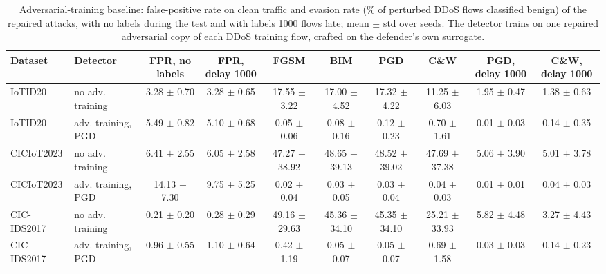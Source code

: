 \begin{table}[t]
\centering
\caption{Adversarial-training baseline: false-positive rate on clean traffic and evasion rate (\% of perturbed DDoS flows classified benign) of the repaired attacks, with no labels during the test and with labels 1000 flows late; mean $\pm$ std over seeds. The detector trains on one repaired adversarial copy of each DDoS training flow, crafted on the defender's own surrogate.}
\label{tab:advtrain}
\footnotesize
\setlength{\tabcolsep}{3pt}
\begin{tabular}{llcccccccc}
\toprule
Dataset & Detector & FPR, no labels & FPR, delay 1000 & FGSM & BIM & PGD & C\&W & PGD, delay 1000 & C\&W, delay 1000 \\
\midrule
IoTID20 & no adv. training & 3.28 $\pm$ 0.70 & 3.28 $\pm$ 0.65 & 17.55 $\pm$ 3.22 & 17.00 $\pm$ 4.52 & 17.32 $\pm$ 4.22 & 11.25 $\pm$ 6.03 & 1.95 $\pm$ 0.47 & 1.38 $\pm$ 0.63 \\
IoTID20 & adv. training, PGD & 5.49 $\pm$ 0.82 & 5.10 $\pm$ 0.68 & 0.05 $\pm$ 0.06 & 0.08 $\pm$ 0.16 & 0.12 $\pm$ 0.23 & 0.70 $\pm$ 1.61 & 0.01 $\pm$ 0.03 & 0.14 $\pm$ 0.35 \\
CICIoT2023 & no adv. training & 6.41 $\pm$ 2.55 & 6.05 $\pm$ 2.58 & 47.27 $\pm$ 38.92 & 48.65 $\pm$ 39.13 & 48.52 $\pm$ 39.02 & 47.69 $\pm$ 37.38 & 5.06 $\pm$ 3.90 & 5.01 $\pm$ 3.78 \\
CICIoT2023 & adv. training, PGD & 14.13 $\pm$ 7.30 & 9.75 $\pm$ 5.25 & 0.02 $\pm$ 0.04 & 0.03 $\pm$ 0.05 & 0.03 $\pm$ 0.04 & 0.04 $\pm$ 0.03 & 0.01 $\pm$ 0.01 & 0.04 $\pm$ 0.03 \\
CIC-IDS2017 & no adv. training & 0.21 $\pm$ 0.20 & 0.28 $\pm$ 0.29 & 49.16 $\pm$ 29.63 & 45.36 $\pm$ 34.10 & 45.35 $\pm$ 34.10 & 25.21 $\pm$ 33.93 & 5.82 $\pm$ 4.48 & 3.27 $\pm$ 4.43 \\
CIC-IDS2017 & adv. training, PGD & 0.96 $\pm$ 0.55 & 1.10 $\pm$ 0.64 & 0.42 $\pm$ 1.19 & 0.05 $\pm$ 0.07 & 0.05 $\pm$ 0.07 & 0.69 $\pm$ 1.58 & 0.03 $\pm$ 0.03 & 0.14 $\pm$ 0.23 \\
\bottomrule
\end{tabular}
\end{table}
